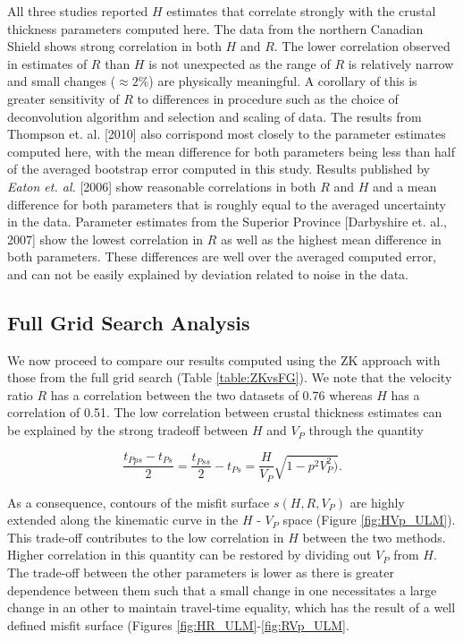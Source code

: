 \documentclass[draft, 12pt]{article}
\begin{document}
All three studies reported $H$ estimates that correlate strongly with the crustal thickness parameters computed here. The data from the northern Canadian Shield shows strong correlation in both $H$ and $R$. The lower correlation observed in estimates of $R$ than $H$ is not unexpected as the range of $R$ is relatively narrow and small changes ($\approx 2\%$) are physically meaningful. A corollary of this is greater sensitivity of $R$ to differences in procedure such as the choice of deconvolution algorithm and selection and scaling of data. The results from Thompson et. al. [2010] also corrispond most closely to the parameter estimates computed here, with the mean difference for both parameters being less than half of the averaged bootstrap error computed in this study. Results published by {\it Eaton et. al.} [2006] show reasonable correlations in both $R$ and $H$ and a mean difference for both parameters that is roughly equal to the averaged uncertainty in the data. Parameter estimates from the Superior Province [Darbyshire et. al., 2007] show the lowest correlation in $R$ as well as the highest mean difference in both parameters. These differences are well over the averaged computed error, and can not be easily explained by deviation related to noise in the data.





\subsection{Full Grid Search Analysis}

We now proceed to compare our results computed using the ZK approach with those from the full grid search (Table \ref{table:ZKvsFG}). We note that the velocity ratio $R$ has a correlation between the two datasets of 0.76 whereas $H$ has a correlation of 0.51. The low correlation between crustal thickness estimates can be explained by the strong tradeoff between $H$ and $V_P$ through the quantity

$$\frac{t_{Pps}-t_{Ps}}{2}=\frac{t_{Pss}}{2} - t_{Ps}= \frac{H}{V_P}\sqrt{1-p^2V^2_P)}.$$

\noindent As a consequence, contours of the misfit surface $s(H,R,V_P)$ are highly extended along the kinematic curve in the $H$ - $V_P$ space (Figure \ref{fig:HVp_ULM}). This trade-off contributes to the low correlation in $H$ between the two methods. Higher correlation in this quantity can be restored by dividing out $V_P$ from $H$. The trade-off between the other parameters is lower as there is greater dependence between them such that a small change in one necessitates a large change in an other to maintain travel-time equality, which has the result of a well defined misfit surface (Figures \ref{fig:HR_ULM}-\ref{fig:RVp_ULM}.
\end{document}
